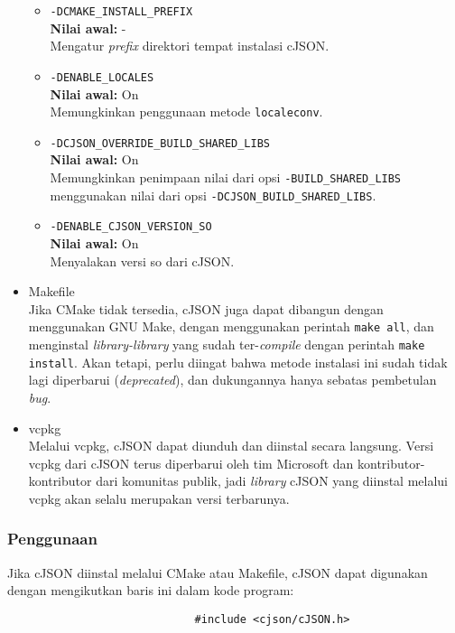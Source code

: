 \begin{itemize}[listparindent=\parindent]
\begin{itemize}
		\item \verb|-DCMAKE_INSTALL_PREFIX|\\
		\textbf{Nilai awal:} -\\
		Mengatur \textit{prefix} direktori tempat instalasi cJSON.
		\item \verb|-DENABLE_LOCALES|\\
		\textbf{Nilai awal:} On\\
		Memungkinkan penggunaan metode \verb|localeconv|.
		\item \verb|-DCJSON_OVERRIDE_BUILD_SHARED_LIBS|\\
		\textbf{Nilai awal:} On\\
		Memungkinkan penimpaan nilai dari opsi \verb|-BUILD_SHARED_LIBS| menggunakan nilai dari opsi \verb|-DCJSON_BUILD_SHARED_LIBS|.
		\item \verb|-DENABLE_CJSON_VERSION_SO|\\
		\textbf{Nilai awal:} On\\
		Menyalakan versi so dari cJSON.
	\end{itemize}

	\item Makefile\\
	Jika CMake tidak tersedia, cJSON juga dapat dibangun dengan menggunakan GNU Make, dengan menggunakan perintah \verb|make all|, dan menginstal \textit{library-library} yang sudah ter-\textit{compile} dengan perintah \verb|make install|. Akan tetapi, perlu diingat bahwa metode instalasi ini sudah tidak lagi diperbarui (\textit{deprecated}), dan dukungannya hanya sebatas pembetulan \textit{bug}.
	
	\item vcpkg\\
	Melalui vcpkg, cJSON dapat diunduh dan diinstal secara langsung. Versi vcpkg dari cJSON terus diperbarui oleh tim Microsoft dan kontributor-kontributor dari komunitas publik, jadi \textit{library} cJSON yang diinstal melalui vcpkg akan selalu merupakan versi terbarunya.
\end{itemize}

\subsubsection{Penggunaan}
\label{sec:cmodules-cJSON-usage}

Jika cJSON diinstal melalui CMake atau Makefile, cJSON dapat digunakan dengan mengikutkan baris ini dalam kode program:

\begin{verbatim}
                             #include <cjson/cJSON.h>
\end{verbatim}

